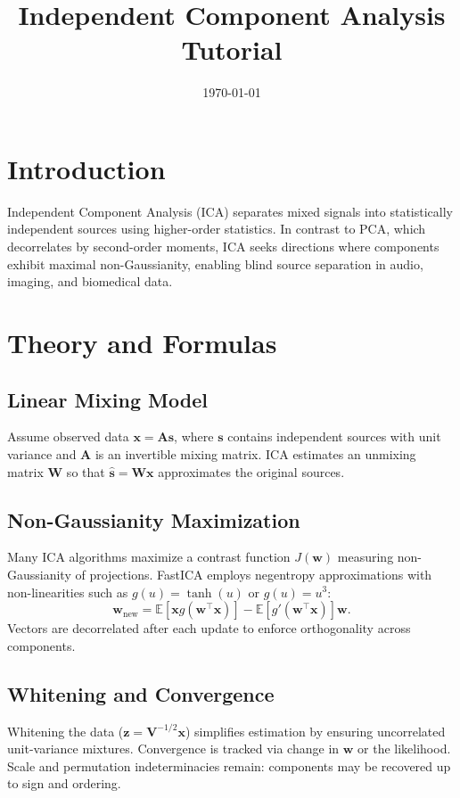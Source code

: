 ﻿\documentclass[12pt]{article}
\title{Independent Component Analysis Tutorial}
\author{}
\date{\today}
\begin{document}
\maketitle

\section{Introduction}
Independent Component Analysis (ICA) separates mixed signals into statistically independent sources using higher-order statistics. In contrast to PCA, which decorrelates by second-order moments, ICA seeks directions where components exhibit maximal non-Gaussianity, enabling blind source separation in audio, imaging, and biomedical data.

\section{Theory and Formulas}
\subsection{Linear Mixing Model}
Assume observed data \(\mathbf{x} = \mathbf{A}\mathbf{s}\), where \(\mathbf{s}\) contains independent sources with unit variance and \(\mathbf{A}\) is an invertible mixing matrix. ICA estimates an unmixing matrix \(\mathbf{W}\) so that \(\hat{\mathbf{s}} = \mathbf{W}\mathbf{x}\) approximates the original sources.

\subsection{Non-Gaussianity Maximization}
Many ICA algorithms maximize a contrast function \(J(\mathbf{w})\) measuring non-Gaussianity of projections. FastICA employs negentropy approximations with non-linearities such as \(g(u)=\tanh(u)\) or \(g(u)=u^3\):
\begin{equation}
\mathbf{w}_{\text{new}} = \mathbb{E}[\mathbf{x}g(\mathbf{w}^\top\mathbf{x})] - \mathbb{E}[g'(\mathbf{w}^\top\mathbf{x})]\mathbf{w}.
\end{equation}
Vectors are decorrelated after each update to enforce orthogonality across components.

\subsection{Whitening and Convergence}
Whitening the data (\(\mathbf{z}=\mathbf{V}^{-1/2}\mathbf{x}\)) simplifies estimation by ensuring uncorrelated unit-variance mixtures. Convergence is tracked via change in \(\mathbf{w}\) or the likelihood. Scale and permutation indeterminacies remain: components may be recovered up to sign and ordering.
\end{document}
